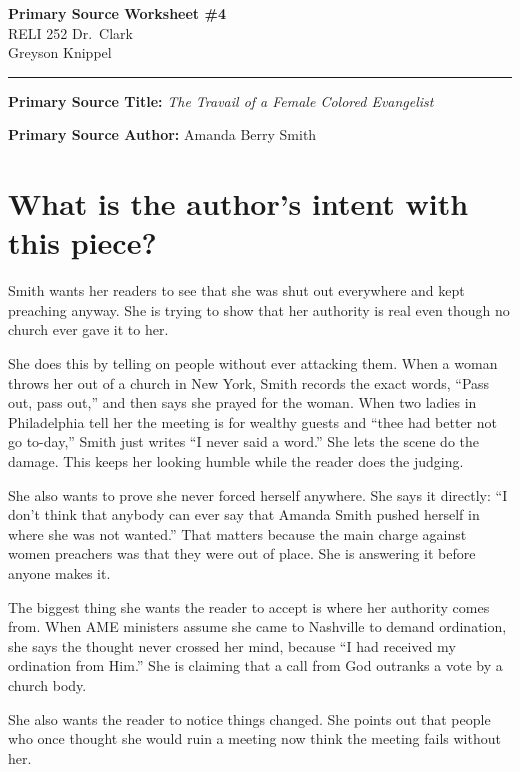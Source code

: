 \documentclass[12pt]{article}
\begin{document}
\begin{center}
	{\Large\bfseries Primary Source Worksheet \#4}\\[0.6em]
	RELI 252 \quad\textbullet\quad Dr.\ Clark\\[0.3em]
	Greyson Knippel
\end{center}

\vspace{1em}
\hrule
\vspace{1.5em}

\noindent\textbf{Primary Source Title:} \textit{The Travail of a Female Colored Evangelist}

\vspace{0.5em}

\noindent\textbf{Primary Source Author:} Amanda Berry Smith

\section*{What is the author's intent with this piece?}

Smith wants her readers to see that she was shut out everywhere and kept preaching anyway. She is trying to show that her authority is real even though no church ever gave it to her.

She does this by telling on people without ever attacking them. When a woman throws her out of a church in New York, Smith records the exact words, ``Pass out, pass out,'' and then says she prayed for the woman. When two ladies in Philadelphia tell her the meeting is for wealthy guests and ``thee had better not go to-day,'' Smith just writes ``I never said a word.'' She lets the scene do the damage. This keeps her looking humble while the reader does the judging.

She also wants to prove she never forced herself anywhere. She says it directly: ``I don't think that anybody can ever say that Amanda Smith pushed herself in where she was not wanted.'' That matters because the main charge against women preachers was that they were out of place. She is answering it before anyone makes it.

The biggest thing she wants the reader to accept is where her authority comes from. When AME ministers assume she came to Nashville to demand ordination, she says the thought never crossed her mind, because ``I had received my ordination from Him.'' She is claiming that a call from God outranks a vote by a church body.

She also wants the reader to notice things changed. She points out that people who once thought she would ruin a meeting now think the meeting fails without her.
\end{document}
